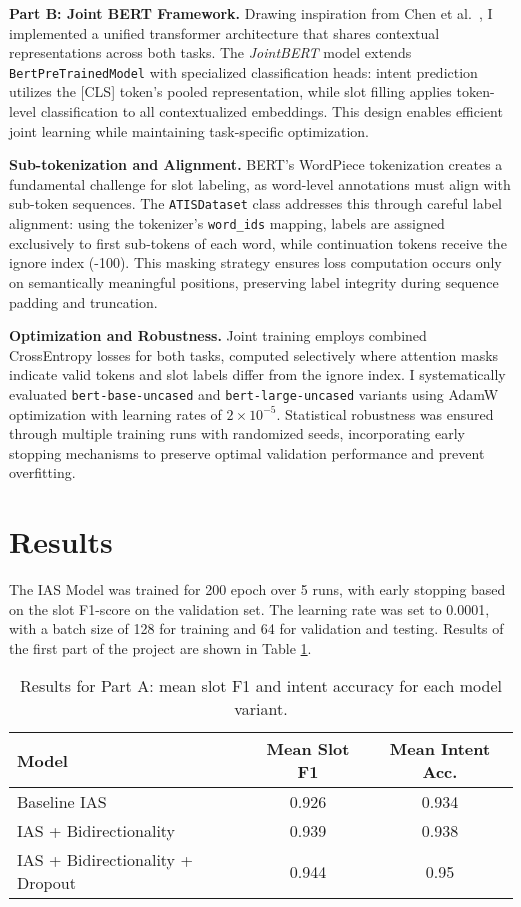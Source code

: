 \documentclass[a4paper]{article}
\begin{document}
\textbf{Part B: Joint BERT Framework.} Drawing inspiration from Chen et al.~\cite{chen2019bertjointintentclassification}, I implemented a unified transformer architecture that shares contextual representations across both tasks. The \textit{JointBERT} model extends \texttt{BertPreTrainedModel} with specialized classification heads: intent prediction utilizes the [CLS] token's pooled representation, while slot filling applies token-level classification to all contextualized embeddings. This design enables efficient joint learning while maintaining task-specific optimization.

\textbf{Sub-tokenization and Alignment.} BERT's WordPiece tokenization creates a fundamental challenge for slot labeling, as word-level annotations must align with sub-token sequences. The \texttt{ATISDataset} class addresses this through careful label alignment: using the tokenizer's \texttt{word\_ids} mapping, labels are assigned exclusively to first sub-tokens of each word, while continuation tokens receive the ignore index (-100). This masking strategy ensures loss computation occurs only on semantically meaningful positions, preserving label integrity during sequence padding and truncation.

\textbf{Optimization and Robustness.} Joint training employs combined CrossEntropy losses for both tasks, computed selectively where attention masks indicate valid tokens and slot labels differ from the ignore index. I systematically evaluated \texttt{bert-base-uncased} and \texttt{bert-large-uncased} variants using AdamW optimization with learning rates of $2 \times 10^{-5}$. Statistical robustness was ensured through multiple training runs with randomized seeds, incorporating early stopping mechanisms to preserve optimal validation performance and prevent overfitting.
\section{Results}
The IAS Model was trained for 200 epoch over 5 runs, with early stopping based on the slot F1-score on the validation set.
The learning rate was set to 0.0001, with a batch size of 128 for training and 64 for validation and testing. 
Results of the first part of the project are shown in Table \ref{tab:partAresults}.
\begin{table}[h!]
  \centering
  \begin{tabular}{lcc}
    \toprule
    \textbf{Model} & \textbf{Mean Slot F1} & \textbf{Mean Intent Acc.} \\
    \midrule
    Baseline IAS & 0.926 & 0.934 \\
    IAS + Bidirectionality & 0.939 & 0.938 \\
    IAS + Bidirectionality + Dropout & 0.944 & 0.95 \\ 
    \bottomrule
  \end{tabular}
  \caption{Results for Part A: mean slot F1 and intent accuracy for each model variant.}
  \label{tab:partAresults}
\end{table}
\end{document}
